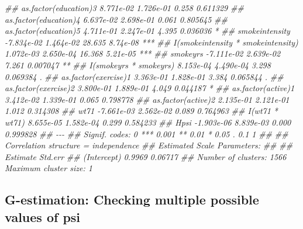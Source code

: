 \documentclass[
  10pt,
  a4paper,
]{book}
\newenvironment{Shaded}{\begin{snugshade}}{\end{snugshade}}
\newcommand{\DocumentationTok}[1]{\textcolor[rgb]{0.37,0.37,0.37}{\textit{#1}}}
\begin{document}
\begin{Shaded}
\begin{Highlighting}[]
\DocumentationTok{\#\# as.factor(education)3               8.771e{-}02  1.726e{-}01  0.258 0.611329    }
\DocumentationTok{\#\# as.factor(education)4               6.637e{-}02  2.698e{-}01  0.061 0.805645    }
\DocumentationTok{\#\# as.factor(education)5               4.711e{-}01  2.247e{-}01  4.395 0.036036 *  }
\DocumentationTok{\#\# smokeintensity                     {-}7.834e{-}02  1.464e{-}02 28.635 8.74e{-}08 ***}
\DocumentationTok{\#\# I(smokeintensity * smokeintensity)  1.072e{-}03  2.650e{-}04 16.368 5.21e{-}05 ***}
\DocumentationTok{\#\# smokeyrs                           {-}7.111e{-}02  2.639e{-}02  7.261 0.007047 ** }
\DocumentationTok{\#\# I(smokeyrs * smokeyrs)              8.153e{-}04  4.490e{-}04  3.298 0.069384 .  }
\DocumentationTok{\#\# as.factor(exercise)1                3.363e{-}01  1.828e{-}01  3.384 0.065844 .  }
\DocumentationTok{\#\# as.factor(exercise)2                3.800e{-}01  1.889e{-}01  4.049 0.044187 *  }
\DocumentationTok{\#\# as.factor(active)1                  3.412e{-}02  1.339e{-}01  0.065 0.798778    }
\DocumentationTok{\#\# as.factor(active)2                  2.135e{-}01  2.121e{-}01  1.012 0.314308    }
\DocumentationTok{\#\# wt71                               {-}7.661e{-}03  2.562e{-}02  0.089 0.764963    }
\DocumentationTok{\#\# I(wt71 * wt71)                      8.655e{-}05  1.582e{-}04  0.299 0.584233    }
\DocumentationTok{\#\# Hpsi                               {-}1.903e{-}06  8.839e{-}03  0.000 0.999828    }
\DocumentationTok{\#\# {-}{-}{-}}
\DocumentationTok{\#\# Signif. codes:  0 \textquotesingle{}***\textquotesingle{} 0.001 \textquotesingle{}**\textquotesingle{} 0.01 \textquotesingle{}*\textquotesingle{} 0.05 \textquotesingle{}.\textquotesingle{} 0.1 \textquotesingle{} \textquotesingle{} 1}
\DocumentationTok{\#\# }
\DocumentationTok{\#\# Correlation structure = independence }
\DocumentationTok{\#\# Estimated Scale Parameters:}
\DocumentationTok{\#\# }
\DocumentationTok{\#\#             Estimate Std.err}
\DocumentationTok{\#\# (Intercept)   0.9969 0.06717}
\DocumentationTok{\#\# Number of clusters:   1566  Maximum cluster size: 1}
\end{Highlighting}
\end{Shaded}

\hypertarget{g-estimation-checking-multiple-possible-values-of-psi}{%
\subsection{G-estimation: Checking multiple possible values of psi}\label{g-estimation-checking-multiple-possible-values-of-psi}}
\end{document}
